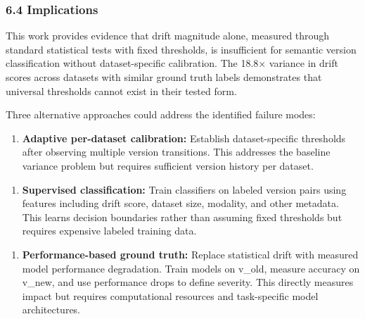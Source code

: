 \subsubsection{6.4 Implications}

This work provides evidence that drift magnitude alone, measured through standard statistical tests with fixed thresholds, is insufficient for semantic version classification without dataset-specific calibration. The 18.8× variance in drift scores across datasets with similar ground truth labels demonstrates that universal thresholds cannot exist in their tested form.

Three alternative approaches could address the identified failure modes:

\begin{enumerate}
\item \textbf{Adaptive per-dataset calibration:} Establish dataset-specific thresholds after observing multiple version transitions. This addresses the baseline variance problem but requires sufficient version history per dataset.
\end{enumerate}

\begin{enumerate}
\item \textbf{Supervised classification:} Train classifiers on labeled version pairs using features including drift score, dataset size, modality, and other metadata. This learns decision boundaries rather than assuming fixed thresholds but requires expensive labeled training data.
\end{enumerate}

\begin{enumerate}
\item \textbf{Performance-based ground truth:} Replace statistical drift with measured model performance degradation. Train models on v_old, measure accuracy on v_new, and use performance drops to define severity. This directly measures impact but requires computational resources and task-specific model architectures.
\end{enumerate}

